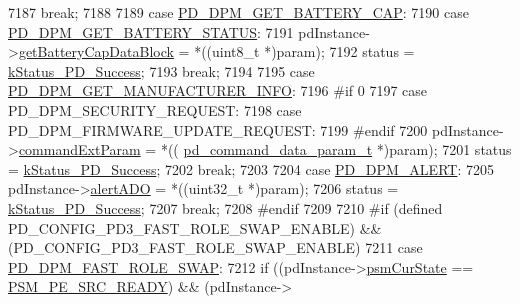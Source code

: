 \begin{DoxyCode}
7187             \textcolor{keywordflow}{break};
7188 
7189         \textcolor{keywordflow}{case} \hyperlink{group__usb__pd__stack_ggabf2676c3360b7c572954ae09c0a5e46aac2fe93d0e29fa39cef8bd57f45ee5a05}{PD\_DPM\_GET\_BATTERY\_CAP}:
7190         \textcolor{keywordflow}{case} \hyperlink{group__usb__pd__stack_ggabf2676c3360b7c572954ae09c0a5e46aaf908c79595be0dd645a1edd222cfa471}{PD\_DPM\_GET\_BATTERY\_STATUS}:
7191             pdInstance->\hyperlink{struct__pd__instance_a26c06a89ab6d2c3fbf265abd7dfc04a3}{getBatteryCapDataBlock} = *((uint8\_t *)param);
7192             status = \hyperlink{group__usb__pd__stack_ggaaad4cd00dd02567c6169429e3a895073acf06f954f9c52f560cea34df48c63555}{kStatus\_PD\_Success};
7193             \textcolor{keywordflow}{break};
7194 
7195         \textcolor{keywordflow}{case} \hyperlink{group__usb__pd__stack_ggabf2676c3360b7c572954ae09c0a5e46aa59afaaae85a74936ea0cc5f66b9fb4ae}{PD\_DPM\_GET\_MANUFACTURER\_INFO}:
7196 \textcolor{preprocessor}{#if 0
}
7197 \textcolor{preprocessor}{}        \textcolor{keywordflow}{case} PD\_DPM\_SECURITY\_REQUEST:
7198         \textcolor{keywordflow}{case} PD\_DPM\_FIRMWARE\_UPDATE\_REQUEST:
7199 \textcolor{preprocessor}{#endif
}
7200 \textcolor{preprocessor}{}            pdInstance->\hyperlink{struct__pd__instance_a05d172382020769919cd2afd088fe164}{commandExtParam} = *((
      \hyperlink{struct__pd__command__data__param}{pd\_command\_data\_param\_t} *)param);
7201             status = \hyperlink{group__usb__pd__stack_ggaaad4cd00dd02567c6169429e3a895073acf06f954f9c52f560cea34df48c63555}{kStatus\_PD\_Success};
7202             \textcolor{keywordflow}{break};
7203 
7204         \textcolor{keywordflow}{case} \hyperlink{group__usb__pd__stack_ggabf2676c3360b7c572954ae09c0a5e46aa8c3275bb19f98d5824b531743b7777a8}{PD\_DPM\_ALERT}:
7205             pdInstance->\hyperlink{struct__pd__instance_a483c8ee561c9edc878c4462f8b073027}{alertADO} = *((uint32\_t *)param);
7206             status = \hyperlink{group__usb__pd__stack_ggaaad4cd00dd02567c6169429e3a895073acf06f954f9c52f560cea34df48c63555}{kStatus\_PD\_Success};
7207             \textcolor{keywordflow}{break};
7208 \textcolor{preprocessor}{#endif
}
7209 \textcolor{preprocessor}{}
7210 \textcolor{preprocessor}{#if (defined PD\_CONFIG\_PD3\_FAST\_ROLE\_SWAP\_ENABLE) && (PD\_CONFIG\_PD3\_FAST\_ROLE\_SWAP\_ENABLE)
}
7211 \textcolor{preprocessor}{}        \textcolor{keywordflow}{case} \hyperlink{group__usb__pd__stack_ggabf2676c3360b7c572954ae09c0a5e46aa1af15d89c350437f5f4e8a95ea841f5b}{PD\_DPM\_FAST\_ROLE\_SWAP}:
7212             \textcolor{keywordflow}{if} ((pdInstance->\hyperlink{struct__pd__instance_a3bc0e6fd670db006ccb2ba39dadedcc5}{psmCurState} == \hyperlink{usb__pd__spec_8h_a745958437dde25902f704348772cec53a007090e305486428e250343237d6e6b0}{PSM\_PE\_SRC\_READY}) && (pdInstance->

\end{DoxyCode}
